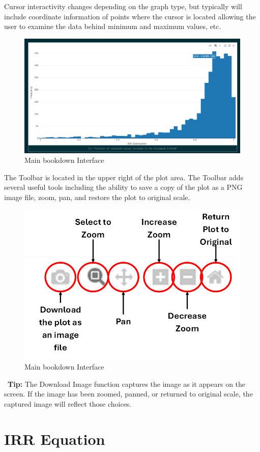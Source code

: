 \documentclass[
]{article}
\begin{document}
Cursor interactivity changes depending on the graph type, but typically will include coordinate information of points where the cursor is located allowing the user to examine the data behind minimum and maximum values, etc.

\begin{figure}

{\centering \includegraphics[width=0.5\linewidth]{Cursor Feedback} 

}

\caption{Main bookdown Interface}\label{fig:unnamed-chunk-14}
\end{figure}

The Toolbar is located in the upper right of the plot area. The Toolbar adds several useful tools including the ability to save a copy of the plot as a PNG image file, zoom, pan, and restore the plot to original scale.

\begin{figure}

{\centering \includegraphics[width=0.5\linewidth]{Plotly Toolbar} 

}

\caption{Main bookdown Interface}\label{fig:unnamed-chunk-15}
\end{figure}

\begin{tipbox}
\faLightbulb\ \textbf{Tip:} The Download Image function captures the image as it appears on the screen.  If the image has been zoomed, panned, or returned to original scale, the captured image will reflect those choices.
\end{tipbox}

\section{IRR Equation}\label{irr-equation}
\end{document}
